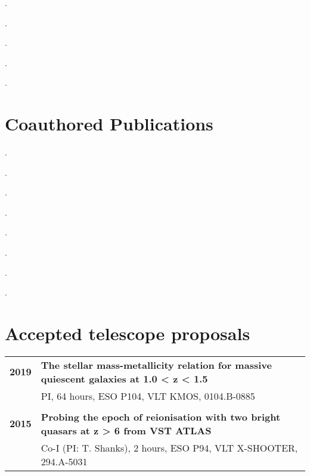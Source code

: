 \documentclass[a4paper,fleqn,usenatbib,onecolumn]{mnras}
\begin{document}
\hangindent=0.45cm . 

\medskip

\hangindent=0.45cm . 

\medskip

\hangindent=0.45cm . 

\medskip

\hangindent=0.45cm . 

\medskip

\hangindent=0.45cm . 

\section*{Coauthored Publications}

\hangindent=0.45cm . 

\medskip

\hangindent=0.45cm . 

\medskip

\hangindent=0.45cm . 

\medskip

\hangindent=0.45cm . 

\medskip

\hangindent=0.45cm . \noindent {}

\medskip

\hangindent=0.45cm . \noindent {}

\medskip

\hangindent=0.45cm . 

\medskip

\hangindent=0.45cm . 

\clearpage

\section*{Accepted telescope proposals}
\begingroup
\setlength{\tabcolsep}{0pt} %
\renewcommand{\arraystretch}{1.05} %
\begin{longtable}{ p{2cm} p{15cm} }

\bf{2019} & \bf{The stellar mass-metallicity relation for massive quiescent galaxies at 1.0 < z < 1.5}\\
& PI, 64 hours, ESO P104, VLT KMOS, 0104.B-0885\\

\\
\bf{2015} & \bf{Probing the epoch of reionisation with two bright quasars at z > 6 from VST ATLAS}\\
& Co-I (PI: T. Shanks), 2 hours, ESO P94, VLT X-SHOOTER, 294.A-5031\\

\end{longtable}
\endgroup
\end{document}

